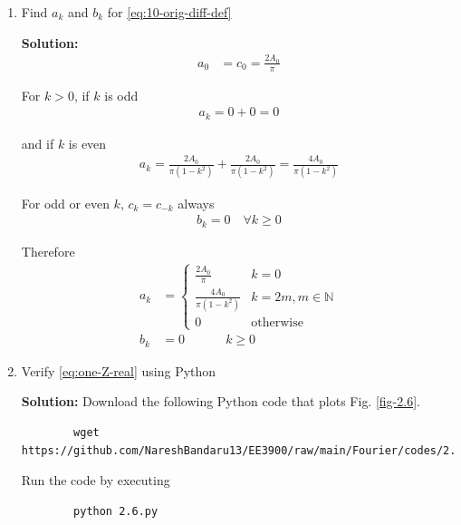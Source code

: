 \documentclass[journal,12pt,twocolumn]{IEEEtran}
\newcommand{\solution}{\noindent \textbf{Solution: }}
\numberwithin{equation}{section}
\numberwithin{figure}{section}
\renewcommand\thesection{\arabic{section}}
\begin{document}
\begin{enumerate}[label=\thesection.\arabic*,ref=\thesection.\theenumi]
	\item Find $a_k$ and $b_k$ for \eqref{eq:10-orig-diff-def}
	
	\solution 
	\begin{align}
		a_0 &= c_0 = \frac{2A_0}{\pi} 
	\end{align}
	
	For $k > 0$, if $k$ is odd
	\begin{align}
		a_k = 0 + 0 = 0
	\end{align}
	
	and if $k$ is even
	\begin{align}
		a_k = \frac{2A_0}{\pi(1-k^2)} + \frac{2A_0}{\pi(1-k^2)} = \frac{4A_0}{\pi(1-k^2)}
	\end{align}
	
	For odd or even $k$, $c_k = c_{-k}$ always
	\begin{align}
		b_k = 0 \quad \forall k \ge 0
	\end{align}
	
	Therefore
	\begin{align}
		a_k &=
		\begin{cases}
			\frac{2A_0}{\pi} & k = 0 \\
			\frac{4A_0}{\pi(1-k^2)} & k = 2m, m \in \mathbb{N} \\
			0 & \text{otherwise}
		\end{cases} \\
		b_k &= 0 \qquad \quad ~ k \ge 0
	\end{align}
	
	\item Verify \eqref{eq:one-Z-real} using Python
	
	\solution Download the following Python code that plots Fig. \ref{fig-2.6}.
	\begin{lstlisting}
		wget https://github.com/NareshBandaru13/EE3900/raw/main/Fourier/codes/2.6.py
	\end{lstlisting}
	
	Run the code by executing
	\begin{lstlisting}
		python 2.6.py
	\end{lstlisting}


\end{enumerate}
\end{document}
